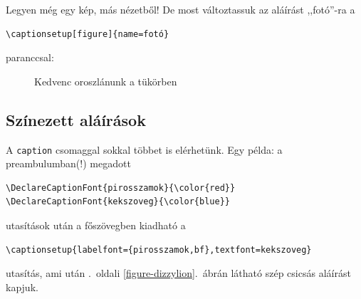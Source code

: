 \documentclass{article}
\begin{document}
\noindent Legyen még egy kép, más nézetből! De most változtassuk az aláírást ,,fotó''-ra a
\begin{verbatim}
\captionsetup[figure]{name=fotó}
\end{verbatim}
\captionsetup[figure]{name=fotó}
paranccsal:
\begin{figure}[hbp]
  \begin{center}
  \end{center}
  \caption{Kedvenc oroszlánunk a tükörben}
\end{figure}

\subsection{Színezett aláírások}
A \verb!caption! csomaggal sokkal többet is elérhetünk. Egy példa:
a preambulumban(!) megadott
\begin{verbatim}
\DeclareCaptionFont{pirosszamok}{\color{red}}
\DeclareCaptionFont{kekszoveg}{\color{blue}}	
\end{verbatim}
utasítások után a főszövegben kiadható a
\begin{verbatim}
\captionsetup{labelfont={pirosszamok,bf},textfont=kekszoveg}
\end{verbatim}
utasítás, ami után   .~oldali \ref{figure-dizzylion}.~ábrán látható szép csicsás aláírást kapjuk.
\end{document}
